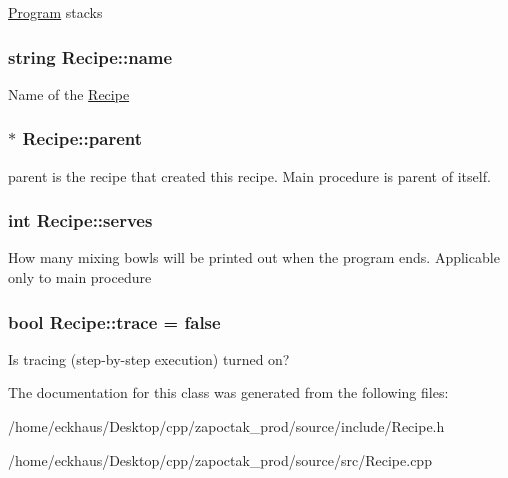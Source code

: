 \hyperlink{classProgram}{Program} stacks \hypertarget{classRecipe_a721508683a186d64b91c64fa1ea72e06}{
\subsubsection[{name}]{\setlength{\rightskip}{0pt plus 5cm}string Recipe\-::name}}\label{classRecipe_a721508683a186d64b91c64fa1ea72e06}
Name of the \hyperlink{classRecipe}{Recipe} \hypertarget{classRecipe_aa0ee8a8dbfef781def252e579bfbc209}{
\subsubsection[{parent}]{$\ast$ Recipe\-::parent}}\label{classRecipe_aa0ee8a8dbfef781def252e579bfbc209}
parent is the recipe that created this recipe. Main procedure is parent of itself. \hypertarget{classRecipe_a265d7fcca7983c4900e76eb10959c9c2}{
\subsubsection[{serves}]{\setlength{\rightskip}{0pt plus 5cm}int Recipe\-::serves}}\label{classRecipe_a265d7fcca7983c4900e76eb10959c9c2}
How many mixing bowls will be printed out when the program ends. Applicable only to main procedure \hypertarget{classRecipe_a88d8c79248361e1c53b8ab3a1b91238c}{
\subsubsection[{trace}]{\setlength{\rightskip}{0pt plus 5cm}bool Recipe\-::trace = false}}\label{classRecipe_a88d8c79248361e1c53b8ab3a1b91238c}
Is tracing (step-\/by-\/step execution) turned on? 

The documentation for this class was generated from the following files\-:\begin{DoxyCompactItemize}
\item 
/home/eckhaus/\-Desktop/cpp/zapoctak\-\_\-prod/source/include/Recipe.\-h\item 
/home/eckhaus/\-Desktop/cpp/zapoctak\-\_\-prod/source/src/Recipe.\-cpp\end{DoxyCompactItemize}
